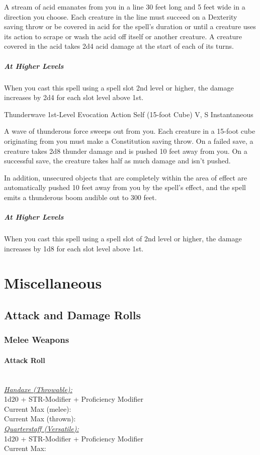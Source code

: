 \documentclass[letterpaper,openany,oneside,twocolumn]{book}
\begin{document}
A stream of acid emanates from you in a line 30 feet long and 5 feet wide in a direction you choose. Each creature in the line must succeed on a Dexterity saving throw or be covered in acid for the spell's duration or until a creature uses its action to scrape or wash the acid off itself or another creature. A creature covered in the acid takes 2d4 acid damage at the start of each of its turns.

\subparagraph*{At Higher Levels} When you cast this spell using a spell slot 2nd level or higher, the damage increases by 2d4 for each slot level above 1st.

\DndSpellHeader
  {Thunderwave}
  {1st-Level Evocation}
  {Action}
  {Self (15-foot Cube)}
  {V, S}
  {Instantaneous}

A wave of thunderous force sweeps out from you. Each creature in a 15-foot cube originating from you must make a Constitution saving throw. On a failed save, a creature takes 2d8 thunder damage and is pushed 10 feet away from you. On a successful save, the creature takes half as much damage and isn't pushed.

In addition, unsecured objects that are completely within the area of effect are automatically pushed 10 feet away from you by the spell's effect, and the spell emits a thunderous boom audible out to 300 feet.

\subparagraph*{At Higher Levels} When you cast this spell using a spell slot of 2nd level or higher, the damage increases by 1d8 for each slot level above 1st.

\vfill\eject
\section*{Miscellaneous}
\subsection*{Attack and Damage Rolls}
\subsubsection*{Melee Weapons}
\paragraph*{Attack Roll}\hfill\\
\underline{\textit{Handaxe (Throwable):}}\\
1d20 + STR-Modifier + Proficiency Modifier\\
\indent Current Max (melee): \\
\indent Current Max (thrown): 
\\
\underline{\textit{Quarterstaff (Versatile):}}\\
1d20 + STR-Modifier + Proficiency Modifier\\
\indent Current Max: 
\end{document}
